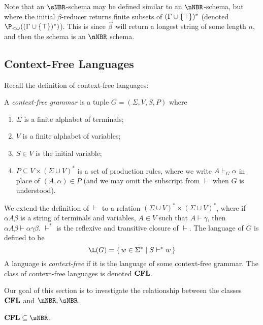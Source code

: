 \documentclass{llncs}
\begin{document}
Note that an $\sNBR$-schema may be defined similar to an $\nNBR$-schema, but where the initial $\beta$-reducer returns finite
subsets of $(\Gamma\cup\set\top)^*$ (denoted $\P_{<\omega}((\Gamma\cup\set\top)^*)$).
This is since $\widehat\beta$ will return a longest string of some length $n$, and then the schema is an $\nNBR$ schema.

\subsection{Context-Free Languages}

Recall the definition of context-free languages:

\begin{definition}

    A \emph{context-free grammar} is a tuple $G=(\Sigma,V,S,P)$ where
    \begin{enumerate}
        \item $\Sigma$ is a finite alphabet of terminals;
        \item $V$ is a finite alphabet of variables;
        \item $S\in V$ is the initial variable;
        \item $P\subseteq V\times(\Sigma\cup V)^*$ is a set of production rules, where we write $A\vdash_G\alpha$ in place of
        $(A,\alpha)\in P$ (and we may omit the subscript from $\vdash$ when $G$ is understood).
    \end{enumerate}
    We extend the definition of $\vdash$ to a relation $(\Sigma\cup V)^*\times(\Sigma\cup V)^*$, where if
    $\alpha A\beta$ is a string of terminals and variables, $A\in V$ such that $A\vdash\gamma$, then
    $\alpha A\beta\vdash\alpha\gamma\beta$.
    $\vdash^*$ is the reflexive and transitive closure of $\vdash$.
    The language of $G$ is defined to be
    $$ \L(G) = \set{w\in\Sigma^*}[S\vdash^*w] $$
    A language is \emph{context-free} if it is the language of some context-free grammar.
    The class of context-free languages is denoted $\hbox{{\bf CFL}}$.

\end{definition}

Our goal of this section is to investigate the relationship between the classes $\hbox{{\bf CFL}}$ and $\nNBR,\sNBR$.

\begin{lemma}

    $\CFL\subseteq\sNBR$.

\end{lemma}
\end{document}

